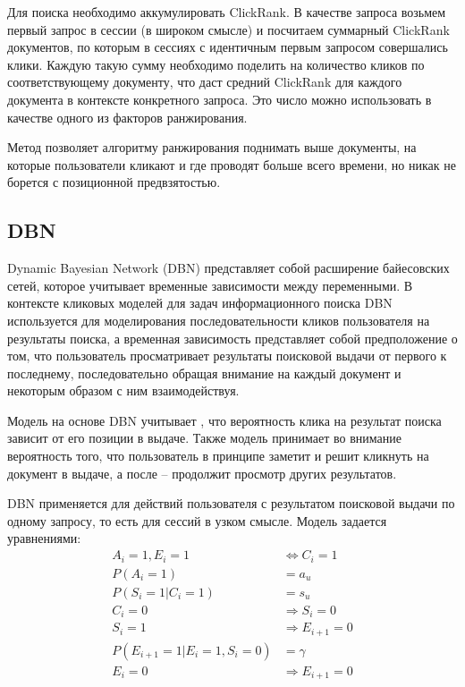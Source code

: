 \documentclass[diploma]{nanolab2015}
\begin{document}
Для поиска необходимо аккумулировать ClickRank. В качестве запроса возьмем первый запрос в сессии (в широком смысле) и посчитаем суммарный ClickRank документов, по которым в сессиях с идентичным первым запросом совершались клики. Каждую такую сумму необходимо поделить на количество кликов по соответствующему документу, что даст средний ClickRank для каждого документа в контексте конкретного запроса. Это число можно использовать в качестве одного из факторов ранжирования.

Метод позволяет алгоритму ранжирования поднимать выше документы, на которые пользователи кликают и где проводят больше всего времени, но никак не борется с позиционной предвзятостью.

\subsection{DBN}
Dynamic Bayesian Network (DBN) представляет собой расширение байесовских сетей, которое учитывает временные зависимости между переменными. В контексте кликовых моделей для задач информационного поиска DBN используется для моделирования последовательности кликов пользователя на результаты поиска, а временная зависимость представляет собой предположение о том, что пользователь просматривает результаты поисковой выдачи от первого к последнему, последовательно обращая внимание на каждый документ и некоторым образом с ним взаимодействуя.

Модель на основе DBN учитывает \cite{DBN}, что вероятность клика на результат поиска зависит от его позиции в выдаче. Также модель принимает во внимание вероятность того, что пользователь в принципе заметит и решит кликнуть на документ в выдаче, а после -- продолжит просмотр других результатов.

DBN применяется для действий пользователя с результатом поисковой выдачи по одному запросу, то есть для сессий в узком смысле. Модель задается уравнениями:
\begin{align}
    A_i = 1, E_i = 1                  & \Leftrightarrow C_i = 1 \label{dbn:1} \\
    P(A_i = 1)                        & = a_u                  \label{dbn:2}  \\
    P(S_i = 1| C_i = 1)               & = s_u                   \label{dbn:3} \\
    C_i = 0                           & \Rightarrow S_i = 0 \label{dbn:4}     \\
    S_i = 1                           & \Rightarrow E_{i+1} = 0 \label{dbn:5} \\
    P(E_{i+1} = 1 | E_i = 1, S_i = 0) & = \gamma                \label{dbn:6} \\
    E_i = 0                           & \Rightarrow E_{i+1} = 0 \label{dbn:7}
\end{align}
\end{document}
